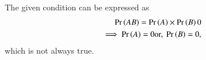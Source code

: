 The given condition can be expressed as
\begin{align}
 \Pr\left(AB\right)=\Pr\left(A\right) \times \Pr\left(B\right)
 0
	\\
	\implies \Pr\left(A\right) = 0 \text{or, } \Pr\left(B\right) = 0,
 \end{align}
 which is not always true.
